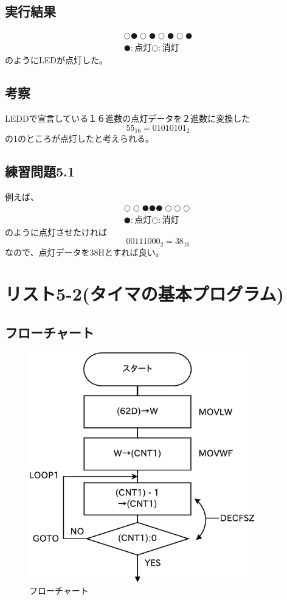 \documentclass[a4paper,12pt]{ujarticle}
\begin{document}
  \subsection{実行結果}
  \begin{eqnarray*}
   ○●○●○●○● \\
   ●:点灯○:消灯
  \end{eqnarray*}
  のようにLEDが点灯した。
  \subsection{考察}
  LEDDで宣言している１６進数の点灯データを２進数に変換した
  \[
  55_{16} = 01010101_2
  \]
  の1のところが点灯したと考えられる。

  \subsection{練習問題5.1}
  例えば、
   \begin{eqnarray*}
    ○○●●●○○○ \\
    ●:点灯○:消灯
   \end{eqnarray*}
   のように点灯させたければ
   \[
    00111000_2 = 38_{16}
   \]
   なので、点灯データを38Hとすれば良い。
 \clearpage
 \section{リスト5-2(タイマの基本プログラム)}
  \subsection{フローチャート}
   \begin{figure}[htbp]
    \begin{center}
     \includegraphics[height=100mm]{Diagram5-2.eps}
    \end{center}
    \caption{フローチャート}
    \label{fig}
   \end{figure}
\end{document}
